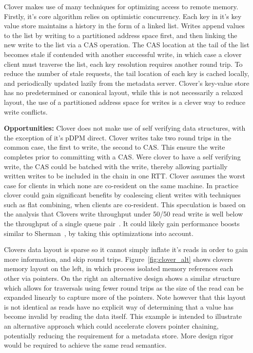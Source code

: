 Clover makes use of many techniques for optimizing access to remote memory.
Firstly, it's core algorithm relies on optimistic concurrency. Each key in it's
key value store maintains a history in the form of a linked list. Writes append
values to the list by writing to a partitioned address space first, and then
linking the new write to the list via a CAS operation. The CAS location at the
tail of the list becomes stale if contended with another successful write, in
which case a clover client must traverse the list, each key resolution requires
another round trip. To reduce the number of stale requests, the tail location of
each key is cached locally, and periodically updated lazily from the metadata
server. Clover's key-value store has no predetermined or canonical layout, while
this is not necessarily a relaxed layout, the use of a partitioned address space
for writes is a clever way to reduce write conflicts.


\textbf{Opportunities:} Clover does not make use of self verifying data
structures, with the exception of it's pDPM direct. Clover writes take two round
trips in the common case, the first to write, the second to CAS. This ensure the
write completes prior to committing with a CAS. Were clover to have a self
verifying write, the CAS could be batched with the write, thereby allowing
partially written writes to be included in the chain in one RTT. Clover assumes
the worst case for clients in which none are co-resident on the same machine. In
practice clover could gain significant benefits by coalescing client writes with
techniques such as flat combining, when clients are co-resident. This
speculation is based on the analysis that Clovers write throughput under 50/50
read write is well below the throughput of a single queue
pair~\cite{design-guidelines}. It could likely gain performance boosts similar
to Sherman~\cite{sherman}, by taking this optimizations into account. 

Clovers data layout is sparse so it cannot simply inflate it's reads in order to
gain more information, and skip round trips. Figure~\ref{fig:clover_alt} shows
clovers memory layout on the left, in which process isolated memory references
each other via pointers. On the right an alternative design shows a similar
structure which allows for traversals using fewer round trips as the size of the
read can be expanded linearly to capture more of the pointers. Note however that
this layout is not identical as reads have no explicit way of determining that a
value has become invalid by reading the data itself. This example is intended to
illustrate an alternative approach which could accelerate clovers pointer
chaining, potentially reducing the requirement for a metadata store. More design
rigor would be required to achieve the same read semantics.


